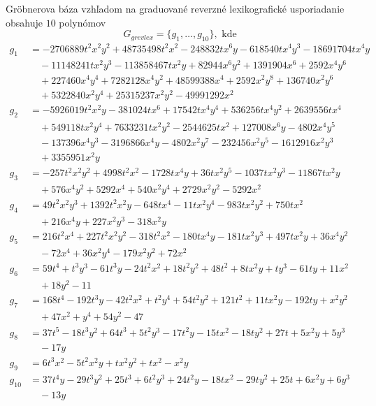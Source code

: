 Gröbnerova báza vzhľadom na graduované reverzné lexikografické usporiadanie obsahuje $10$ polynómov
$$ G_{grevlex} = \{g_1,\dots ,g_{10} \}, \text{ kde } $$
\begin{align*}
g_1 &= -2706889t^2x^2y^2 + 48735498t^2x^2 - 248832tx^6y - 618540tx^4y^3 - 18691704tx^4y\\ 
&\quad - 11148241tx^2y^3 - 113858467tx^2y + 82944x^6y^2 + 1391904x^6 + 2592x^4y^6\\ 
&\quad + 227460x^4y^4 + 7282128x^4y^2 + 48599388x^4 + 2592x^2y^8 + 136740x^2y^6 \\ 
&\quad + 5322840x^2y^4 + 25315237x^2y^2 - 49991292x^2 \\ 
g_2 &= -5926019t^2x^2y - 381024tx^6 + 17542tx^4y^4 + 536256tx^4y^2  + 2639556tx^4 \\ 
&\quad  + 549118tx^2y^4 + 7633231tx^2y^2 - 2544625tx^2 + 127008x^6y - 4802x^4y^5 \\
&\quad  - 137396x^4y^3 - 3196866x^4y - 4802x^2y^7 - 232456x^2y^5 - 1612916x^2y^3 \\ 
&\quad  + 3355951x^2y \\
g_3 &= -257t^2x^2y^2 + 4998t^2x^2 - 1728tx^4y + 36tx^2y^5 - 1037tx^2y^3 - 11867tx^2y \\ 
&\quad  + 576x^4y^2 + 5292x^4 + 540x^2y^4 + 2729x^2y^2 - 5292x^2 \\ 
g_4 &= 49t^2x^2y^3 + 1392t^2x^2y - 648tx^4 - 11tx^2y^4 - 983tx^2y^2 + 750tx^2 \\ 
&\quad  + 216x^4y + 227x^2y^3 - 318x^2y \\ 
g_5 &= 216t^2x^4 + 227t^2x^2y^2 - 318t^2x^2 - 180tx^4y - 181tx^2y^3 + 497tx^2y + 36x^4y^2 \\ 
&\quad - 72x^4 + 36x^2y^4 - 179x^2y^2 + 72x^2 \\ 
g_6 &= 59t^4 + t^3y^3 - 61t^3y - 24t^2x^2 + 18t^2y^2 + 48t^2 + 8tx^2y + ty^3 - 61ty + 11x^2 \\ 
&\quad  + 18y^2 - 11 \\ 
g_7 &= 168t^4 - 192t^3y - 42t^2x^2 + t^2y^4 + 54t^2y^2 + 121t^2 + 11tx^2y - 192ty + x^2y^2 \\ 
&\quad  + 47x^2 + y^4 + 54y^2 - 47 \\ 
g_8 &= 37t^5 - 18t^3y^2 + 64t^3 + 5t^2y^3 - 17t^2y - 15tx^2 - 18ty^2 + 27t + 5x^2y + 5y^3  \\ 
&\quad - 17y \\
g_9 &= 6t^3x^2 - 5t^2x^2y + tx^2y^2 + tx^2 - x^2y \\  
g_{10} &= 37t^4y - 29t^3y^2 + 25t^3 + 6t^2y^3 + 24t^2y - 18tx^2 - 29ty^2 + 25t + 6x^2y + 6y^3 \\
&\quad - 13y \\ 
\end{align*}


 
